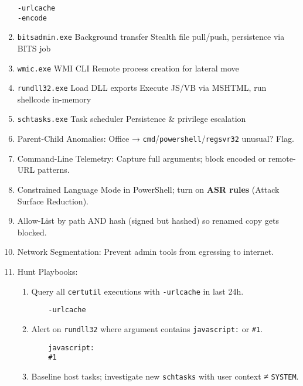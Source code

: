 \documentclass[a4paper,12pt]{article}
\begin{document}
\begin{enumerate}[leftmargin=*,itemsep=0.5em]
\begin{tcolorbox}[colback=codebg, boxrule=0.5pt, arc=4pt, boxsep=5pt]
\begin{verbatim}
-urlcache
-encode
\end{verbatim}
\end{tcolorbox}
\item \texttt{bitsadmin.exe} Background transfer Stealth file pull/push, persistence via BITS job
\item \texttt{wmic.exe} WMI CLI Remote process creation for lateral move
\item \texttt{rundll32.exe} Load DLL exports Execute JS/VB via MSHTML, run shellcode in-memory
\item \texttt{schtasks.exe} Task scheduler Persistence \& privilege escalation
\item Parent-Child Anomalies: Office → \texttt{cmd}/\texttt{powershell}/\texttt{regsvr32} unusual? Flag.
\item Command-Line Telemetry: Capture full arguments; block encoded or remote-URL patterns.
\item Constrained Language Mode in PowerShell; turn on \textbf{ASR rules} (Attack Surface Reduction).
\item Allow-List by path AND hash (signed but hashed) so renamed copy gets blocked.
\item Network Segmentation: Prevent admin tools from egressing to internet.
\item Hunt Playbooks:
\begin{enumerate}
    \item Query all \texttt{certutil} executions with \texttt{-urlcache} in last 24h.
    \begin{tcolorbox}[colback=codebg, boxrule=0.5pt, arc=4pt, boxsep=5pt]
    \begin{verbatim}
    -urlcache
    \end{verbatim}
    \end{tcolorbox}
    \item Alert on \texttt{rundll32} where argument contains \texttt{javascript:} or \texttt{\#1}.
    \begin{tcolorbox}[colback=codebg, boxrule=0.5pt, arc=4pt, boxsep=5pt]
    \begin{verbatim}
    javascript:
    #1
    \end{verbatim}
    \end{tcolorbox}
    \item Baseline host tasks; investigate new \texttt{schtasks} with user context ≠ \texttt{SYSTEM}.

\end{enumerate}
\end{enumerate}
\end{document}
